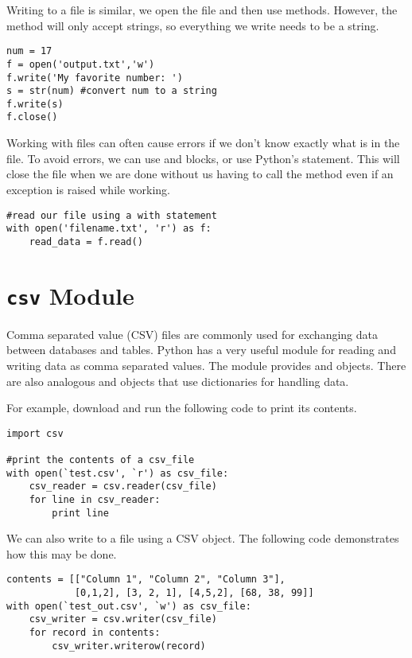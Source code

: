 Writing to a file is similar, we open the file and then use methods. 
However, the  method will only accept strings, so everything we write needs to be a string.

\begin{lstlisting}
num = 17
f = open('output.txt','w')
f.write('My favorite number: ')
s = str(num) #convert num to a string
f.write(s)
f.close()
\end{lstlisting}

Working with files can often cause errors if we don't know exactly what is in the file.
To avoid errors, we can use  and  blocks, or use Python's  statement.
This will close the file when we are done without us having to call the  method even if an exception is raised while working.

\begin{lstlisting}
#read our file using a with statement
with open('filename.txt', 'r') as f:
	read_data = f.read()
\end{lstlisting}

\section*{\texttt{csv} Module}
Comma separated value (CSV) files are commonly used for exchanging data between databases and tables. 
Python has a very useful module for reading and writing data as comma separated values.
The  module provides  and  objects.
There are also analogous  and  objects that use dictionaries for handling data.

For example, download  and run the following code to print its contents.
\begin{lstlisting}
import csv

#print the contents of a csv_file
with open(`test.csv', `r') as csv_file:
    csv_reader = csv.reader(csv_file)
    for line in csv_reader:
        print line
\end{lstlisting}

We can also write to a  file using a CSV  object.  The following code demonstrates how this may be done.

\begin{lstlisting}
contents = [["Column 1", "Column 2", "Column 3"],
            [0,1,2], [3, 2, 1], [4,5,2], [68, 38, 99]]
with open(`test_out.csv', `w') as csv_file:
    csv_writer = csv.writer(csv_file)
    for record in contents:
        csv_writer.writerow(record)
\end{lstlisting}

